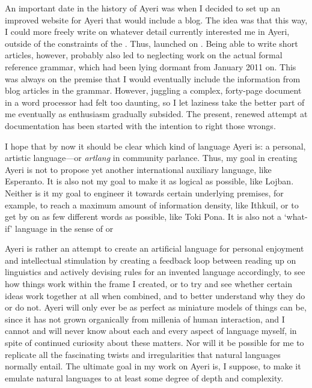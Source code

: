 An important date in the history of Ayeri was when I decided to set up an
improved website for Ayeri that would include a blog. The idea was that this
way, I could more freely write on whatever detail currently interested me in
Ayeri, outside of the constraints of the . Thus,  launched on . Being able to write
short articles, however, probably also led to neglecting work on the actual
formal reference grammar, which had been lying dormant from January 2011 on.
This was always on the premise that I would eventually include the information
from blog articles in the grammar. However, juggling a complex, forty-page
document in a word processor had felt too daunting, so I let laziness take the
better part of me eventually as enthusiasm gradually subsided. 
The present, renewed attempt at documentation has been started with the
intention to right those wrongs.

I hope that by now it should be clear which kind of language Ayeri is: a
personal, artistic language---or \emph{artlang} in community parlance. Thus, my
goal in creating Ayeri is not to propose yet another international
auxiliary language, like Esperanto. It is also not my goal to make it as
logical as possible, like Lojban. Neither is it my goal to engineer it towards
certain underlying premises, for example, to reach a maximum amount of
information density, like Ithkuil, or to get by on as few different words as
possible, like Toki Pona. It is also not a `what-if' language in the sense of
 or 

Ayeri is rather an attempt to create an artificial language for personal
enjoyment and intellectual stimulation by creating a feedback loop between
reading up on linguistics and actively devising rules for an invented language
accordingly, to see how things work within the frame I created, or to try and
see whether certain ideas work together at all when combined, and to better
understand why they do or do not. Ayeri will only ever be as perfect as
miniature models of things can be, since it has not grown organically from
millenia of human interaction, and I cannot and will never know about each and
every aspect of language myself, in spite of continued curiosity about these
matters. Nor will it be possible for me to replicate all the fascinating twists
and irregularities that natural languages normally entail. The ultimate
goal in my work on Ayeri is, I suppose, to make it emulate natural
languages to at least some degree of depth and complexity.

